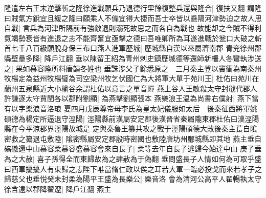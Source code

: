 隆遣左右王末逆擊斬之隆徐進戰願兵乃退德行里餘復整兵還與隆合|{
	復扶又翻}
謂隆曰賊氣方銳宜且緩之隆曰願乘人不備宜得大捷而吾士卒皆以懸隔河津勢迫之故人思自戰|{
	言兵為河津所隔前有強敵退則溺死故思之而各自為戰也}
故能却之今賊不得利氣竭勢衰皆有進退之志不能齊奮宜亟擊之德曰吾唯卿所為耳遂進戰於瓮口大破之斬首七千八百級願脫身保三布口燕人進軍歷城|{
	歷城縣自漢以來屬濟南郡}
青兖徐州郡縣壁壘多降|{
	降戶江翻}
垂以陳留王紹為青州刺史鎮歷城德等還師新柵人冬鸞執涉送之|{
	果如慕容隆所料唐韻冬姓也}
垂誅涉父子餘悉原之　三月秦主登以竇衝為南秦州牧楊定為益州牧楊璧為司空梁州牧乞伏國仁為大將軍大單于苑川王|{
	杜佑曰苑川在蘭州五泉縣近大小榆谷余謂杜佑以意言之單音蟬}
燕上谷人王敏殺太守封戢代郡人許謙逐太守賈閏各以郡附劉顯|{
	為燕擊劉顯張本}
燕樂浪王温為尚書右僕射|{
	燕下當有以字樂浪音洛琅}
夏四月戊辰尊帝母李氏為皇太妃儀服如太后　後秦征西將軍姚碩德為楊定所逼退守涇陽|{
	涇陽縣前漢屬安定郡後漢晉省秦屬隴東郡杜佑曰漢涇陽縣在今平涼郡界涇陽故城是}
定與秦魯王纂共攻之戰于涇陽碩德大敗後秦主萇自隂密救之纂退屯敷陸|{
	隂密縣屬安定郡殷時密國也敷陸唐坊州鄜城縣即其地}
燕主垂自碻磝還中山慕容柔慕容盛慕容會來自長子|{
	柔等去年自長子逃歸今始達中山}
庚子垂為之大赦|{
	喜子孫得全而東歸故為之肆赦為于偽翻}
垂問盛長子人情如何為可取乎盛曰西軍擾擾人有東歸之志陛下唯當脩仁政以俟之耳若大軍一臨必投戈而來若孝子之歸慈父也垂悦癸未封柔為陽平王盛為長樂公|{
	樂音洛}
會為清河公高平人翟暢執太守徐含遠以郡降翟遼|{
	降戶江翻}
燕主

